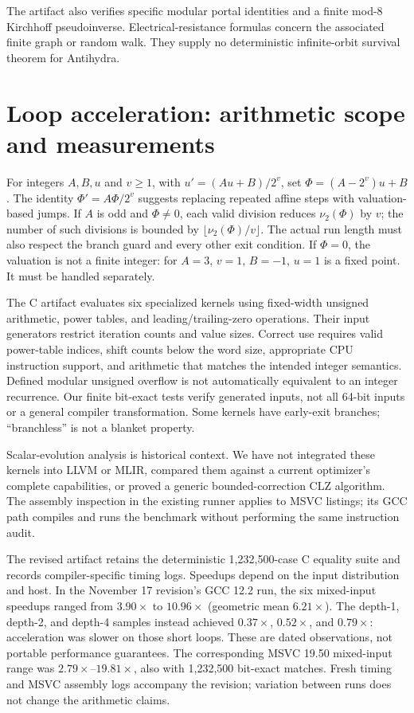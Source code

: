 \documentclass[11pt]{article}
\DeclareRobustCommand{\_}{\ifmmode\sb\else\textunderscore\allowbreak\fi}
\theoremstyle{definition}
\theoremstyle{remark}
\begin{document}
The artifact also verifies specific modular portal identities and a finite mod-8 Kirchhoff pseudoinverse. Electrical-resistance formulas \cite{chandra1996electrical} concern the associated finite graph or random walk. They supply no deterministic infinite-orbit survival theorem for Antihydra.

\section{Loop acceleration: arithmetic scope and measurements}
\label{sec:bench}
For integers $A,B,u$ and $v\ge1$, with $u'=(Au+B)/2^v$, set $\Phi=(A-2^v)u+B$. The identity $\Phi'=A\Phi/2^v$ suggests replacing repeated affine steps with valuation-based jumps. If $A$ is odd and $\Phi\ne0$, each valid division reduces $\nu_2(\Phi)$ by $v$; the number of such divisions is bounded by $\lfloor\nu_2(\Phi)/v\rfloor$. The actual run length must also respect the branch guard and every other exit condition. If $\Phi=0$, the valuation is not a finite integer: for $A=3$, $v=1$, $B=-1$, $u=1$ is a fixed point. It must be handled separately.

The C artifact evaluates six specialized kernels using fixed-width unsigned arithmetic, power tables, and leading/trailing-zero operations. Their input generators restrict iteration counts and value sizes. Correct use requires valid power-table indices, shift counts below the word size, appropriate CPU instruction support, and arithmetic that matches the intended integer semantics. Defined modular unsigned overflow is not automatically equivalent to an integer recurrence. Our finite bit-exact tests verify generated inputs, not all 64-bit inputs or a general compiler transformation. Some kernels have early-exit branches; ``branchless'' is not a blanket property.

Scalar-evolution analysis \cite{pop2005scev} is historical context. We have not integrated these kernels into LLVM or MLIR, compared them against a current optimizer's complete capabilities, or proved a generic bounded-correction CLZ algorithm. The assembly inspection in the existing runner applies to MSVC listings; its GCC path compiles and runs the benchmark without performing the same instruction audit.

The revised artifact retains the deterministic 1,232,500-case C equality suite and records compiler-specific timing logs. Speedups depend on the input distribution and host. In the November 17 revision's GCC 12.2 run, the six mixed-input speedups ranged from $3.90\times$ to $10.96\times$ (geometric mean $6.21\times$). The depth-1, depth-2, and depth-4 samples instead achieved $0.37\times$, $0.52\times$, and $0.79\times$: acceleration was slower on those short loops. These are dated observations, not portable performance guarantees. The corresponding MSVC 19.50 mixed-input range was $2.79\times$--$19.81\times$, also with 1,232,500 bit-exact matches. Fresh timing and MSVC assembly logs accompany the revision; variation between runs does not change the arithmetic claims.
\end{document}
